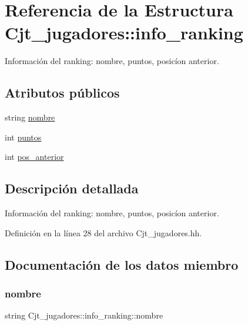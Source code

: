\hypertarget{struct_cjt__jugadores_1_1info__ranking}{}\section{Referencia de la Estructura Cjt\+\_\+jugadores\+:\+:info\+\_\+ranking}
\label{struct_cjt__jugadores_1_1info__ranking}


Información del ranking\+: nombre, puntos, posicíon anterior.  


\subsection*{Atributos públicos}
\begin{DoxyCompactItemize}
\item 
string \hyperlink{struct_cjt__jugadores_1_1info__ranking_a9f0be0dd186ae9693b9b83e316adb1e3}{nombre}
\item 
int \hyperlink{struct_cjt__jugadores_1_1info__ranking_a9548a26f4ce9f133898897695cf0469f}{puntos}
\item 
int \hyperlink{struct_cjt__jugadores_1_1info__ranking_a94cae50fbd756efb92e76e6f9cc396ce}{pos\+\_\+anterior}
\end{DoxyCompactItemize}


\subsection{Descripción detallada}
Información del ranking\+: nombre, puntos, posicíon anterior. 

Definición en la línea 28 del archivo Cjt\+\_\+jugadores.\+hh.



\subsection{Documentación de los datos miembro}
\mbox{\label{struct_cjt__jugadores_1_1info__ranking_a9f0be0dd186ae9693b9b83e316adb1e3}} 
\subsubsection{\texorpdfstring{nombre}{nombre}}
{\footnotesize\ttfamily string Cjt\+\_\+jugadores\+::info\+\_\+ranking\+::nombre}




